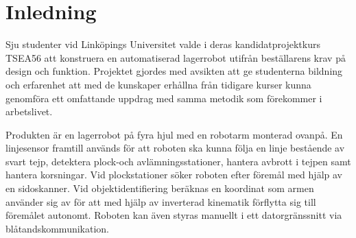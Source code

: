 

\section{Inledning}
Sju studenter vid Linköpings Universitet valde i deras kandidatprojektkurs TSEA56 att konstruera en automatiserad lagerrobot utifrån beställarens krav på design och funktion. Projektet gjordes med avsikten att ge studenterna bildning och erfarenhet att med de kunskaper erhållna från tidigare kurser kunna genomföra ett omfattande uppdrag med samma metodik som förekommer i arbetslivet.

Produkten är en lagerrobot på fyra hjul med en robotarm monterad ovanpå. En linjesensor framtill används för att roboten ska kunna följa en linje bestående av svart tejp, detektera plock-och avlämningsstationer, hantera avbrott i tejpen samt hantera korsningar. Vid plockstationer söker roboten efter föremål med hjälp av en sidoskanner. Vid objektidentifiering beräknas en koordinat som armen använder sig av för att med hjälp av inverterad kinematik förflytta sig till föremålet autonomt. Roboten kan även styras manuellt i ett datorgränssnitt via blåtandskommunikation. 

